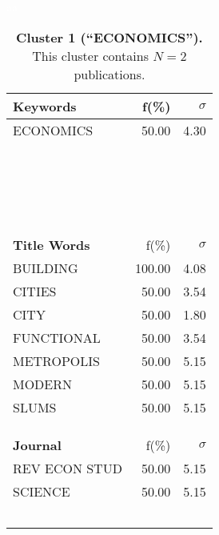 \documentclass[a4paper,11pt]{report}
\begin{document}
\begin{landscape}
\clearpage

\begin{table}[!ht]
\caption*{{\bf Cluster 1 (``ECONOMICS'').} This cluster contains $N = 2$ publications.} 
\textcolor{white}{aa}\\
{\scriptsize\begin{tabular}{|p{5cm} r r|}
\hline
{\bf Keywords }& f(\%) & $\sigma$\\
\hline
ECONOMICS & 50.00 & 4.30\\
 &  & \\
 &  & \\
 &  & \\
 &  & \\
 &  & \\
 &  & \\
 &  & \\
 &  & \\
 &  & \\
 &  & \\
 &  & \\
 &  & \\
 &  & \\
 &  & \\
 &  & \\
 &  & \\
 &  & \\
 &  & \\
 &  & \\
\hline
{\bf Title Words }& f(\%) & $\sigma$\\
\hline
BUILDING & 100.00 & 4.08\\
CITIES & 50.00 & 3.54\\
CITY & 50.00 & 1.80\\
FUNCTIONAL & 50.00 & 3.54\\
METROPOLIS & 50.00 & 5.15\\
MODERN & 50.00 & 5.15\\
SLUMS & 50.00 & 5.15\\
 &  & \\
 &  & \\
 &  & \\
\hline
{\bf Journal }& f(\%) & $\sigma$\\
\hline
REV ECON STUD & 50.00 & 5.15\\
SCIENCE & 50.00 & 5.15\\
 &  & \\
 &  & \\
 &  & \\
 &  & \\
 &  & \\

\end{tabular}}
\end{table}
\end{landscape}
\end{document}
